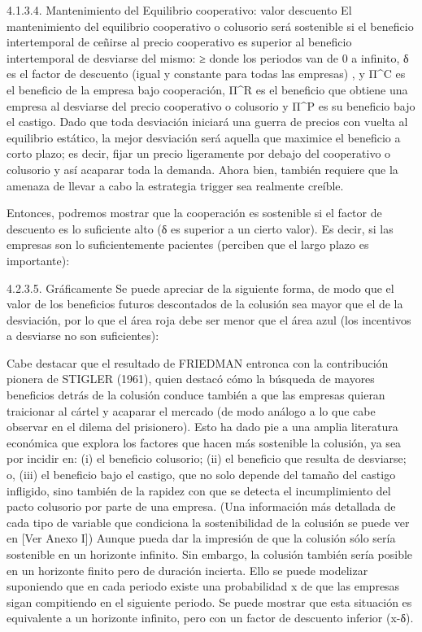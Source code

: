\documentclass[10pt,a4paper]{article}
\begin{document}
4.1.3.4. Mantenimiento del Equilibrio cooperativo: valor descuento
El mantenimiento del equilibrio cooperativo o colusorio será sostenible si el beneficio intertemporal de ceñirse al precio cooperativo es superior al beneficio intertemporal de desviarse del mismo:
 ≥ 
donde los periodos van de 0 a infinito, δ es el factor de descuento (igual y constante para todas las empresas) ,  y Π^C es el beneficio de la empresa bajo cooperación, Π^R es el beneficio que obtiene una empresa al desviarse del precio cooperativo o colusorio y Π^P es su beneficio bajo el castigo.  Dado que toda desviación iniciará una guerra de precios con vuelta al equilibrio estático, la mejor desviación será aquella que maximice el beneficio a corto plazo; es decir, fijar un precio ligeramente por debajo del cooperativo o colusorio y así acaparar toda la demanda. Ahora bien, también requiere que la amenaza de llevar a cabo la estrategia trigger sea realmente creíble. 

Entonces, podremos mostrar que la cooperación es sostenible si el factor de descuento es lo suficiente alto (δ es superior a un cierto valor). Es decir, si las empresas son lo suficientemente pacientes (perciben que el largo plazo es importante):


    
4.2.3.5. Gráficamente
Se puede apreciar de la siguiente forma, de modo que el valor de los beneficios futuros descontados de la colusión sea mayor que el de la desviación, por lo que el área roja debe ser menor que el área azul (los incentivos a desviarse no son suficientes):
 
 
Cabe destacar que el resultado de FRIEDMAN  entronca con la contribución pionera de STIGLER (1961), quien destacó cómo la búsqueda de mayores beneficios detrás de la colusión conduce también a que las empresas quieran traicionar al cártel y acaparar el mercado (de modo análogo a lo que cabe observar en el dilema del prisionero). Esto ha dado pie a una amplia literatura económica que explora los factores que hacen más sostenible la colusión, ya sea por incidir en: (i) el beneficio colusorio; (ii) el beneficio que resulta de desviarse; o, (iii) el beneficio bajo el castigo, que no solo depende del tamaño del castigo infligido, sino también de la rapidez con que se detecta el incumplimiento del pacto colusorio por parte de una empresa. (Una información más detallada de cada tipo de variable que condiciona la sostenibilidad de la colusión se puede ver en [Ver Anexo I])
Aunque pueda dar la impresión de que la colusión sólo sería sostenible en un horizonte infinito. Sin embargo, la colusión también sería posible en un horizonte finito pero de duración incierta. Ello se puede modelizar suponiendo que en cada periodo existe una probabilidad x de que las empresas sigan compitiendo en el siguiente periodo.  Se puede mostrar que esta situación es equivalente a un horizonte infinito, pero con un factor de descuento inferior (x-δ). 
\end{document}
